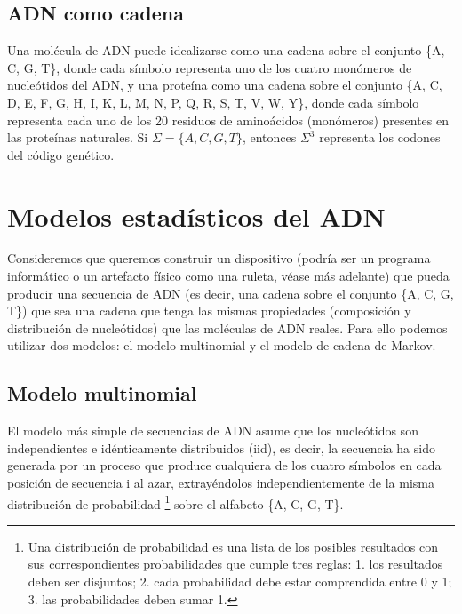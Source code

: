 \subsection{ADN como cadena}
Una molécula de ADN puede idealizarse como una cadena sobre el conjunto \{A, C, G, T\}, donde cada símbolo representa uno de los cuatro monómeros de nucleótidos del ADN, y una proteína como una cadena sobre el conjunto \{A, C, D, E, F, G, H, I, K, L, M, N, P, Q, R, S, T, V, W, Y\}, donde cada símbolo representa cada uno de los 20 residuos de aminoácidos (monómeros) presentes en las proteínas naturales. Si $\Sigma = \{A, C, G, T\}$, entonces $\Sigma^3$ representa los codones del código genético.

\section{Modelos estadísticos del ADN}
Consideremos que queremos construir un dispositivo (podría ser un programa informático o un artefacto físico como una ruleta, véase más adelante) que pueda producir una secuencia de ADN (es decir, una cadena sobre el conjunto \{A, C, G, T\}) que sea una cadena que tenga las mismas propiedades (composición y distribución de nucleótidos) que las moléculas de ADN reales. Para ello podemos utilizar dos modelos: el modelo multinomial y el modelo de cadena de Markov.

\subsection{Modelo multinomial}
El modelo más simple de secuencias de ADN asume que los nucleótidos son independientes e idénticamente distribuidos (iid), es decir, la secuencia ha sido generada por un proceso que produce cualquiera de los cuatro símbolos en cada posición de secuencia i al azar, extrayéndolos independientemente de la misma distribución de probabilidad \footnote{Una distribución de probabilidad es una lista de los posibles resultados con sus correspondientes probabilidades que cumple tres reglas: 1. los resultados deben ser disjuntos; 2. cada probabilidad debe estar comprendida entre 0 y 1; 3. las probabilidades deben sumar 1.} sobre el alfabeto \{A, C, G, T\}.

